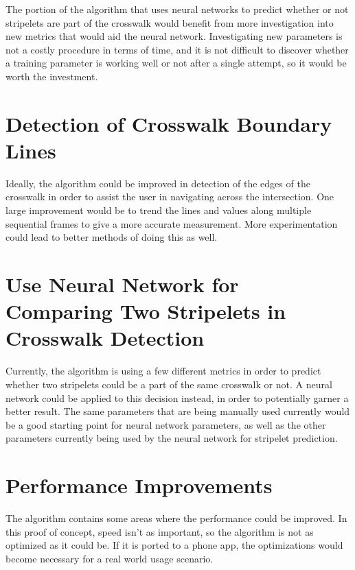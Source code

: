 \documentclass[12pt]{ucthesis}
\begin{document}
The portion of the algorithm that uses neural networks to predict whether or not stripelets are part of the crosswalk would benefit from more investigation into new metrics that would aid the neural network. Investigating new parameters is not a costly procedure in terms of time, and it is not difficult to discover whether a training parameter is working well or not after a single attempt, so it would be worth the investment.  

\section{Detection of Crosswalk Boundary Lines}

Ideally, the algorithm could be improved in detection of the edges of the crosswalk in order to assist the user in navigating across the intersection. One large improvement would be to trend the lines and values along multiple sequential frames to give a more accurate measurement. More experimentation could lead to better methods of doing this as well. 

\section{Use Neural Network for Comparing Two Stripelets in Crosswalk Detection}

Currently, the algorithm is using a few different metrics in order to predict whether two stripelets could be a part of the same crosswalk or not. A neural network could be applied to this decision instead, in order to potentially garner a better result. The same parameters that are being manually used currently would be a good starting point for neural network parameters, as well as the other parameters currently being used by the neural network for stripelet prediction. 

\section{Performance Improvements}

The algorithm contains some areas where the performance could be improved. In this proof of concept, speed isn't as important, so the algorithm is not as optimized as it could be. If it is ported to a phone app, the optimizations would become necessary for a real world usage scenario.
\end{document}
